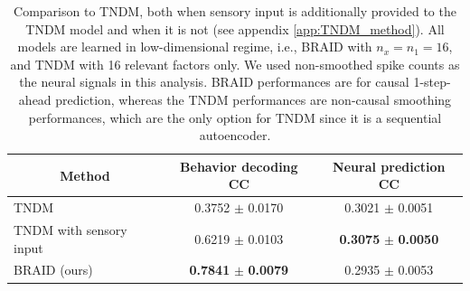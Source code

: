 \documentclass{article} %
\newcommand{\ourmethod}{BRAID}
\newcommand{\ourmethodlinear}{linear \ourmethod}
\newcommand{\ourmethodunsup}{U-\ourmethod}
\begin{document}


\begin{table}[h]
\caption{Comparison to TNDM, both when sensory input is additionally provided to the TNDM model and when it is not (see appendix \ref{app:TNDM_method}). All models are learned in low-dimensional regime, i.e., \ourmethod{} with $n_x=n_1=16$, and TNDM with 16 relevant factors only. We used non-smoothed spike counts as the neural signals in this analysis. \ourmethod{} performances are for causal 1-step-ahead prediction, whereas the TNDM performances are non-causal smoothing performances, which are the only option for TNDM since it is a sequential autoencoder.}
\label{tab: TNDM_comparison}
\begin{center}
\begin{tabular}{l|c|c}
\multicolumn{1}{c|}{\textbf{Method}} & \multicolumn{1}{c|}{\textbf{Behavior decoding CC}} & \multicolumn{1}{c}{\textbf{Neural prediction CC}} \\
\midrule
TNDM & 0.3752 \(\pm\) 0.0170 & 0.3021 \(\pm\) 0.0051 \\
TNDM with sensory input & 0.6219 \(\pm\) 0.0103 & \textbf{0.3075} \(\pm\) \textbf{0.0050}\\
\midrule
\ourmethod{} (ours)& \textbf{0.7841} \(\pm\) \textbf{0.0079}  & 0.2935 \(\pm\) 0.0053\\
\end{tabular}
\end{center}
\end{table}
\end{document}
